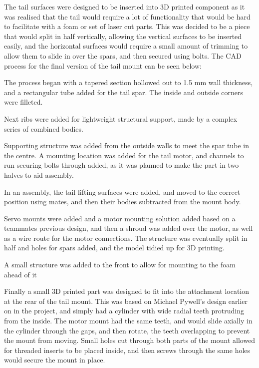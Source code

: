 \documentclass[../../main.tex]{subfiles}
\begin{document}
The tail surfaces were designed to be inserted into 3D printed component as it was realised that the tail would require a lot of functionality that would be hard to facilitate with a foam or set of laser cut parts.
This was decided to be a piece that would split in half vertically, allowing the vertical surfaces to be inserted easily, and the horizontal surfaces would require a small amount of trimming to allow them to slide in over the spars, and then secured using bolts.
The CAD process for the final version of the tail mount can be seen below:


The process began with a tapered section hollowed out to 1.5 mm wall thickness, and a rectangular tube added for the tail spar.
The inside and outside corners were filleted. 

Next ribs were added for lightweight structural support, made by a complex series of combined bodies.  

Supporting structure was added from the outside walls to meet the spar tube in the centre.
A mounting location was added for the tail motor, and channels to run securing bolts through added, as it was planned to make the part in two halves to aid assembly.  

In an assembly, the tail lifting surfaces were added, and moved to the correct position using mates, and then their bodies subtracted from the mount body. 

Servo mounts were added and a motor mounting solution added based on a teammates previous design, and then a shroud was added over the motor, as well as a wire route for the motor connections.
The structure was eventually split in half and holes for spars added, and the model tidied up for 3D printing. 

A small structure was added to the front to allow for mounting to the foam ahead of it 

Finally a small 3D printed part was designed to fit into the attachment location at the rear of the tail mount.
This was based on Michael Pywell’s design earlier on in the project, and simply had a cylinder with wide radial teeth protruding from the inside.
The motor mount had the same teeth, and would slide axially in the cylinder through the gaps, and then rotate, the teeth overlapping to prevent the mount from moving.
Small holes cut through both parts of the mount allowed for threaded inserts to be placed inside, and then screws through the same holes would secure the mount in place. 
\end{document}
